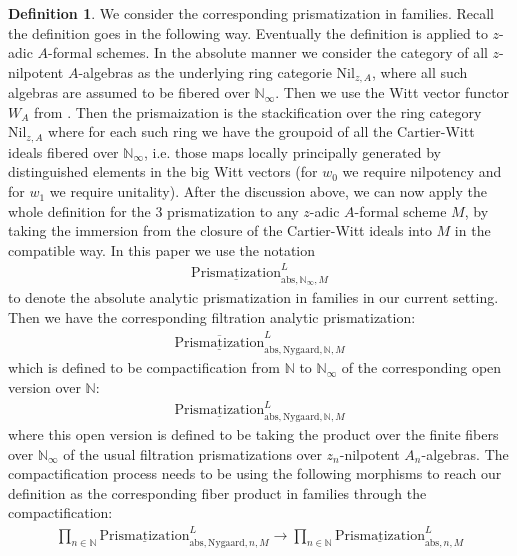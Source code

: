 \documentclass[12pt]{article}
\theoremstyle{definition}
\newtheorem{definition}{Definition}
\begin{document}
\begin{definition} 
We consider the corresponding prismatization in families. Recall the definition goes in the following way. Eventually the definition is applied to $z$-adic $A$-formal schemes. In the absolute manner we consider the category of all $z$-nilpotent $A$-algebras as the underlying ring categorie $\mathrm{Nil}_{z,A}$, where all such algebras are assumed to be fibered over $\mathbb{N}_\infty$. Then we use the Witt vector functor $W_A$ from \cite{3LH}. Then the prismaization is the stackification over the ring category $\mathrm{Nil}_{z,A}$ where for each such ring we have the groupoid of all the Cartier-Witt ideals fibered over $\mathbb{N}_\infty$, i.e. those maps locally principally generated by distinguished elements in the big Witt vectors (for $w_0$ we require nilpotency and for $w_1$ we require unitality). After the discussion above, we can now apply the whole definition for the 3 prismatization to any $z$-adic $A$-formal scheme $M$, by taking the immersion from the closure of the Cartier-Witt ideals into $M$ in the compatible way. In this paper we use the notation 
\begin{align}
\underline{\mathrm{Prismatization}}^L_{\mathrm{abs},\mathbb{N}_\infty,M}
\end{align}
to denote the absolute analytic prismatization in families in our current setting. Then we have the corresponding filtration analytic prismatization:
\begin{align}
\overline{\underline{\mathrm{Prismatization}}}^L_{\mathrm{abs},\mathrm{Nygaard},\mathbb{N},M}
\end{align}
which is defined to be compactification from $\mathbb{N}$ to $\mathbb{N}_\infty$ of the corresponding open version over $\mathbb{N}$:
\begin{align}
{\underline{\mathrm{Prismatization}}}^L_{\mathrm{abs},\mathrm{Nygaard},\mathbb{N},M}
\end{align}
where this open version is defined to be taking the product over the finite fibers over $\mathbb{N}_\infty$ of the usual filtration prismatizations over $z_n$-nilpotent $A_n$-algebras. The compactification process needs to be using the following morphisms to reach our definition as the corresponding fiber product in families through the compactification:
\begin{align}
\prod_{n\in \mathbb{N}} {\underline{\mathrm{Prismatization}}}^L_{\mathrm{abs},\mathrm{Nygaard},n,M}\rightarrow  \prod_{n\in \mathbb{N}} {\underline{\mathrm{Prismatization}}}^L_{\mathrm{abs},n,M}
\end{align}

\end{definition}
\end{document}

